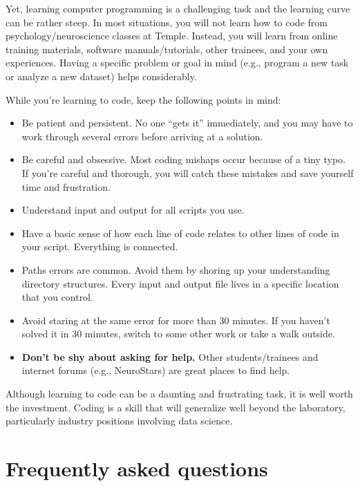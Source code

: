 \documentclass[letterpaper,12pt,oneside]{memoir}
\begin{document}
Yet, learning computer programming is a challenging task and the learning curve can be rather steep. In most situations, you will not learn how to code from psychology/neuroscience classes at Temple. Instead, you will learn from online training materials, software manuals/tutorials, other trainees, and your own experiences. Having a specific problem or goal in mind (e.g., program a new task or analyze a new dataset) helps considerably.

While you're learning to code, keep the following points in mind:

\begin{itemize}

\item Be patient and persistent. No one ``gets it'' immediately, and you may have to work through several errors before arriving at a solution. 
\item Be careful and obsessive. Most coding mishaps occur because of a tiny typo. If you're careful and thorough, you will catch these mistakes and save yourself time and frustration. 
\item Understand input and output for all scripts you use.
\item Have a basic sense of how each line of code relates to other lines of code in your script. Everything is connected. 
\item Paths errors are common. Avoid them by shoring up your understanding directory structures. Every input and output file lives in a specific location that you control. 
\item Avoid staring at the same error for more than 30 minutes. If you haven't solved it in 30 minutes, switch to some other work or take a walk outside.
\item \textbf{Don't be shy about asking for help.} Other students/trainees and internet forums (e.g., NeuroStars) are great places to find help.

\end{itemize}


\begin{shaded}
\noindent Although learning to code can be a daunting and frustrating task, it is well worth the investment. Coding is a skill that will generalize well beyond the laboratory, particularly industry positions involving data science. 
\end{shaded}


\chapter{Frequently asked questions}
\end{document}
